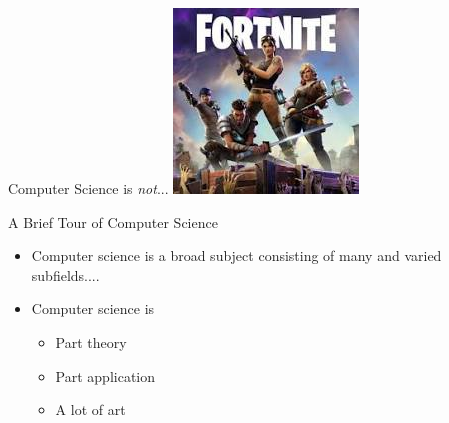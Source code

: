 \documentclass{beamer}
\begin{document}
\begin{frame}{Computer Science is \emph{not}...} 
\centering \includegraphics[width=.5\linewidth]{img/fortnite.jpg}
\end{frame}

%

\begin{frame}{A Brief Tour of Computer Science}
\begin{itemize}
	\item Computer science is a broad subject consisting of many and varied subfields....
	\item Computer science is
	\begin{itemize}
		\item Part theory
		\item Part application
		\item A lot of art
	\end{itemize}
\end{itemize}
\end{frame}
\end{document}
